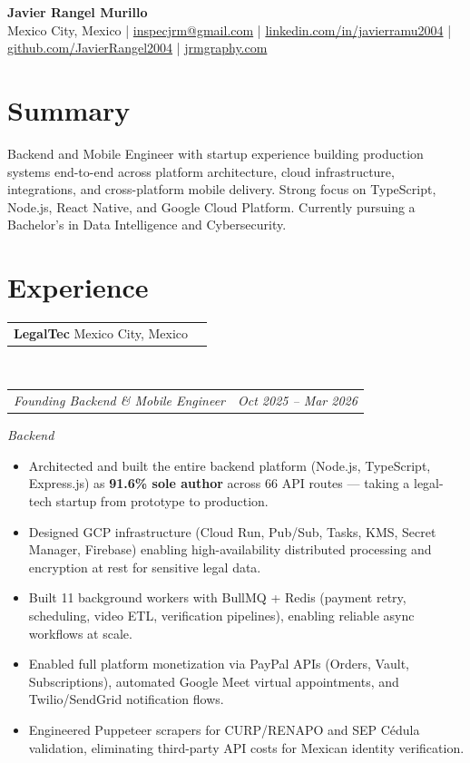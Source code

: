 \documentclass[10pt, letterpaper]{article}
\makeatletter
\newcommand{\entry}[2]{%
  \noindent\begin{tabular*}{\textwidth}{@{}l@{\extracolsep{\fill}}r@{}}
    #1 & #2
  \end{tabular*}}
\newenvironment{cvlist}{%
  \begin{itemize}[leftmargin=1.2em,itemsep=0.5pt,topsep=2pt,parsep=0pt]
}{\end{itemize}}
\makeatother
\begin{document}
\pagestyle{empty}

\begin{center}
  {\LARGE\bfseries Javier Rangel Murillo}\\[2pt]
  Mexico City, Mexico \enspace|\enspace
  \href{mailto:inspecjrm@gmail.com}{inspecjrm@gmail.com} \enspace|\enspace
  \href{https://linkedin.com/in/javierramu2004}{linkedin.com/in/javierramu2004} \enspace|\enspace
  \href{https://github.com/JavierRangel2004}{github.com/JavierRangel2004} \enspace|\enspace
  \href{https://jrmgraphy.com}{jrmgraphy.com}
\end{center}

\section{Summary}

Backend and Mobile Engineer with startup experience building production systems
end-to-end across platform architecture, cloud infrastructure, integrations, and
cross-platform mobile delivery.
Strong focus on TypeScript, Node.js, React Native, and Google Cloud Platform.
Currently pursuing a Bachelor's in Data Intelligence and Cybersecurity.

\section{Experience}

\entry{\textbf{LegalTec} \quad Mexico City, Mexico}{}\\
\entry{\textit{Founding Backend \& Mobile Engineer}}{\textit{Oct 2025 -- Mar 2026}}

\smallskip
\textit{Backend}
\begin{cvlist}
  \item Architected and built the entire backend platform (Node.js, TypeScript, Express.js)
        as \textbf{91.6\% sole author} across 66 API routes — taking a legal-tech startup from
        prototype to production.
  \item Designed GCP infrastructure (Cloud Run, Pub/Sub, Tasks, KMS, Secret Manager, Firebase)
        enabling high-availability distributed processing and encryption at rest for sensitive
        legal data.
  \item Built 11 background workers with BullMQ + Redis (payment retry, scheduling, video ETL,
        verification pipelines), enabling reliable async workflows at scale.
  \item Enabled full platform monetization via PayPal APIs (Orders, Vault, Subscriptions),
        automated Google Meet virtual appointments, and Twilio/SendGrid notification flows.
  \item Engineered Puppeteer scrapers for CURP/RENAPO and SEP C\'{e}dula validation,
        eliminating third-party API costs for Mexican identity verification.
\end{cvlist}
\end{document}
